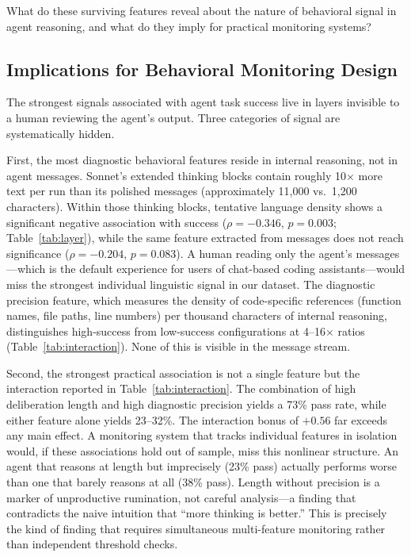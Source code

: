 \documentclass[11pt]{article}
\begin{document}
What do these surviving features reveal about the nature of behavioral signal in agent reasoning, and what do they imply for practical monitoring systems?

\subsection{Implications for Behavioral Monitoring Design}

The strongest signals associated with agent task success live in layers invisible to a human reviewing the agent's output.
Three categories of signal are systematically hidden.

First, the most diagnostic behavioral features reside in internal reasoning, not in agent messages.
Sonnet's extended thinking blocks contain roughly 10$\times$ more text per run than its polished messages (approximately 11,000 vs.\ 1,200 characters).
Within those thinking blocks, tentative language density shows a significant negative association with success ($\rho = -0.346$, $p = 0.003$; Table~\ref{tab:layer}), while the same feature extracted from messages does not reach significance ($\rho = -0.204$, $p = 0.083$).
A human reading only the agent's messages---which is the default experience for users of chat-based coding assistants---would miss the strongest individual linguistic signal in our dataset.
The diagnostic precision feature, which measures the density of code-specific references (function names, file paths, line numbers) per thousand characters of internal reasoning, distinguishes high-success from low-success configurations at 4--16$\times$ ratios (Table~\ref{tab:interaction}).
None of this is visible in the message stream.

Second, the strongest practical association is not a single feature but the interaction reported in Table~\ref{tab:interaction}.
The combination of high deliberation length and high diagnostic precision yields a 73\% pass rate, while either feature alone yields 23--32\%.
The interaction bonus of $+0.56$ far exceeds any main effect.
A monitoring system that tracks individual features in isolation would, if these associations hold out of sample, miss this nonlinear structure.
An agent that reasons at length but imprecisely (23\% pass) actually performs worse than one that barely reasons at all (38\% pass).
Length without precision is a marker of unproductive rumination, not careful analysis---a finding that contradicts the naive intuition that ``more thinking is better.''
This is precisely the kind of finding that requires simultaneous multi-feature monitoring rather than independent threshold checks.
\end{document}
